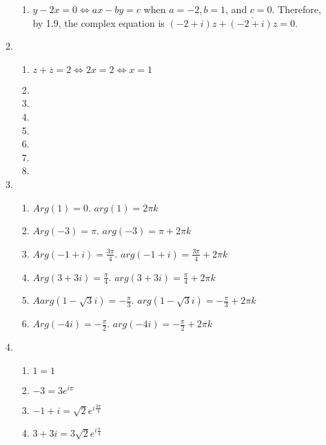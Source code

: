 \documentclass{article}%
\begin{document}
\begin{enumerate}
\begin{enumerate}[label*=\arabic*.]
\begin{enumerate}[label=\alph*]
            \item $y-2x=0 \Leftrightarrow ax-by=c$ when $a=-2, b=1$, and $c=0$. Therefore, by 1.9, the complex equation is $(-2+i)z+\overline{(-2+i)z}=0$.
        \end{enumerate}
        \item %
        \begin{enumerate}[label=\alph*]
            \item %
                $z+\overline{z}=2 \Leftrightarrow 2x=2 \Leftrightarrow x=1$
            \item %
            \item %
            \item %
            \item %
            \item %
            \item %
            \item %
        \end{enumerate}
        \item %
        \begin{enumerate}[label=\alph*]
            \item %
                $Arg(1) = 0$. $arg(1)=2\pi k$
            \item %
                $Arg(-3)=\pi$. $arg(-3)=\pi + 2\pi k$
            \item %
                $Arg(-1+i)=\frac{3\pi}{4}$. $arg(-1+i)=\frac{3\pi}{4}+2\pi k$
            \item %
                $Arg(3+3i)=\frac{\pi}{4}$. $arg(3+3i)=\frac{\pi}{4}+2\pi k$
            \item %
                $Aarg(1-\sqrt{3}i)=-\frac{\pi}{3}$. $arg(1-\sqrt{3}i)=-\frac{\pi}{3}+2\pi k$
            \item %
                $Arg(-4i)=-\frac{\pi}{2}$. $arg(-4i)=-\frac{\pi}{2}+2\pi k$
        \end{enumerate}
        \item %
        \begin{enumerate}[label=\alph*]
            \item %
                $1=1$
            \item %
                $-3=3e^{i\pi}$
            \item %
                $-1+i=\sqrt{2}e^{i\frac{3\pi}{4}}$
            \item %
                $3+3i=3\sqrt{2}e^{i\frac{\pi}{4}}$

\end{enumerate}
\end{enumerate}
\end{enumerate}
\end{document}
